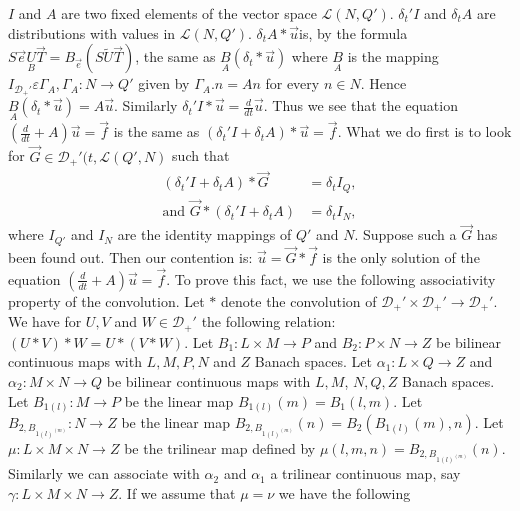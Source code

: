 $I$ and $A$ are two fixed elements of the vector space $\mathscr{L}(N,
Q')$. $\delta_t' I$ and $\delta_t A$ are distributions with values in
$\mathscr{L}(N, Q')$.
\noindent $\delta_t A * \overrightarrow{u}$\pageoriginale is, by the
formula $S \overrightarrow{e} \underset{B}{U} \overrightarrow{T} =
B_{\overrightarrow{e}} (S\tilde{U} \overrightarrow{T})$, the same as
$\underset{A}{B}(\delta_t * \overrightarrow{u})$ where
$\underset{A}{B}$ is the mapping $I_{\mathscr{D}_+'} \varepsilon
\Gamma_A, \Gamma_A : N \to Q'$ given by $\Gamma_A . n = A n$ for every
$n \in N$. Hence $\underset{A}{B} (\delta_t * \overrightarrow{u}) = A
\overrightarrow{u}$. Similarly $\delta_t' I * \overrightarrow{u} =
\frac{d}{dt} \overrightarrow{u}$. Thus we see that the equation
$(\frac{d}{dt} + A) \overrightarrow{u} = \overrightarrow{f}$ is the
same as $( \delta_t' I + \delta_t A) * \overrightarrow{u} =
\overrightarrow{f}$. What we do first is to look for
$\overrightarrow{G} \in \mathscr{D}_+' (t, \mathscr{L}(Q', N)$ such
that 
\begin{align*}
(\delta_t' I + \delta_t A) * \overrightarrow{G} &= \delta_t I_Q,\\
\text{and }  \overrightarrow{G} * (\delta_t' I + \delta_t
A) &= \delta_t I_N,
\end{align*}
where $I_{Q'}$ and $I_N$ are the identity mappings of $Q'$ and
$N$. Suppose such a $\overrightarrow{G}$ has been found out. Then our
contention is: $\overrightarrow{u} = \overrightarrow{G} *
\overrightarrow{f}$ is the only solution of the equation
$(\frac{d}{dt} + A) \overrightarrow{u} = \overrightarrow{f}$. To prove
this fact, we use the following associativity property of the
convolution. Let $*$ denote the convolution of $\mathscr{D}_+' \times
\mathscr{D}_+' \to \mathscr{D}_+'$. We have for $U, V$ and $W \in
\mathscr{D}_+'$ the following relation: $(U * V) * W = U * (V * W)$. 
\noindent Let $B_1 : L \times M \to P$ and $B_2 : P \times N \to Z$ be
bilinear continuous maps with $L, M, P, N$ and $Z$ Banach spaces. Let
$\alpha_1 : L \times Q \to Z$ and $\alpha_2 : M \times N \to Q$ be
bilinear continuous maps with $L, M$, $N, Q, Z$ Banach spaces. Let
$B_{1(l)} : M \to P$ be the linear map $B_{1(l)}(m) = B_1(l, m)$. Let
$B_{2, B_{1(l)^{(m)}}}: N \to Z$ be the linear map
$B_{2,B_{1(l)^{(m)}}}(n)= B_2(B_{1(l)}(m), n)$. Let $\mu:L \times
M\times N \to Z$ be the trilinear map defined by $\mu(l, m, n) =
B_{2,B_{1(l)^{(m)}}}(n)$. Similarly we can associate with $\alpha_2$
and $\alpha_1$ a trilinear continuous map, say $\gamma : L \times M
\times N \to Z$. If we assume that $\mu = \nu$ we have the following
